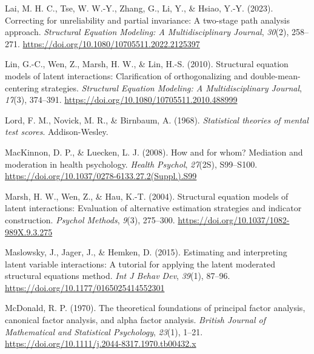 \documentclass[
  man]{apa6}
\newlength{\cslhangindent}
\newlength{\cslentryspacingunit} %
\newenvironment{CSLReferences}[2] %
 {%
  \setlength{\parindent}{0pt}
  \ifodd #1
  \let\oldpar\par
  \def\par{\hangindent=\cslhangindent\oldpar}
  \fi
  \setlength{\parskip}{#2\cslentryspacingunit}
 }%
 {}
\begin{document}
\begin{CSLReferences}{1}{0}
\leavevmode{}%
Lai, M. H. C., Tse, W. W.-Y., Zhang, G., Li, Y., \& Hsiao, Y.-Y. (2023). Correcting for unreliability and partial invariance: {A} two-stage path analysis approach. \emph{Structural Equation Modeling: A Multidisciplinary Journal}, \emph{30}(2), 258--271. \url{https://doi.org/10.1080/10705511.2022.2125397}

\leavevmode{}%
Lin, G.-C., Wen, Z., Marsh, H. W., \& Lin, H.-S. (2010). Structural equation models of latent interactions: {Clarification} of orthogonalizing and double-mean-centering strategies. \emph{Structural Equation Modeling: A Multidisciplinary Journal}, \emph{17}(3), 374--391. \url{https://doi.org/10.1080/10705511.2010.488999}

\leavevmode{}%
Lord, F. M., Novick, M. R., \& Birnbaum, A. (1968). \emph{Statistical theories of mental test scores}. Addison-Wesley.

\leavevmode{}%
MacKinnon, D. P., \& Luecken, L. J. (2008). How and for whom? {Mediation} and moderation in health psychology. \emph{Health Psychol}, \emph{27}(2S), S99--S100. \url{https://doi.org/10.1037/0278-6133.27.2(Suppl.).S99}

\leavevmode{}%
Marsh, H. W., Wen, Z., \& Hau, K.-T. (2004). Structural equation models of latent interactions: Evaluation of alternative estimation strategies and indicator construction. \emph{Psychol Methods}, \emph{9}(3), 275--300. \url{https://doi.org/10.1037/1082-989X.9.3.275}

\leavevmode{}%
Maslowsky, J., Jager, J., \& Hemken, D. (2015). Estimating and interpreting latent variable interactions: {A} tutorial for applying the latent moderated structural equations method. \emph{Int J Behav Dev}, \emph{39}(1), 87--96. \url{https://doi.org/10.1177/0165025414552301}

\leavevmode{}%
McDonald, R. P. (1970). The theoretical foundations of principal factor analysis, canonical factor analysis, and alpha factor analysis. \emph{British Journal of Mathematical and Statistical Psychology}, \emph{23}(1), 1--21. \url{https://doi.org/10.1111/j.2044-8317.1970.tb00432.x}


\end{CSLReferences}
\end{document}
